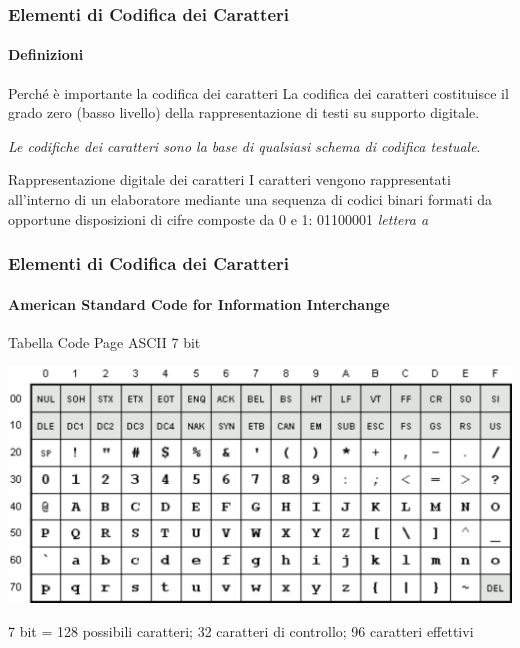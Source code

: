\begin{frame}
	\frametitle{Elementi di Codifica dei Caratteri}
	\framesubtitle{Definizioni}
	\addtocounter{nframe}{1}

	\begin{block}{Perché è importante la codifica dei caratteri}
		La codifica dei caratteri costituisce il grado zero (basso livello) della rappresentazione di testi su supporto digitale.
		\begin{center}
			\textit{Le codifiche dei caratteri sono la base di qualsiasi schema di codifica testuale}.
		\end{center}
	\end{block}

	\begin{block}{Rappresentazione digitale dei caratteri}
		I caratteri vengono rappresentati all’interno di un elaboratore mediante una sequenza di codici binari formati da opportune disposizioni di cifre composte da 0 e 1: 01100001 \textit{lettera a}
	\end{block}

\end{frame}



\begin{frame}
	\frametitle{Elementi di Codifica dei Caratteri}
	\framesubtitle{American Standard Code for Information Interchange}
	\addtocounter{nframe}{1}

	\begin{block}{Tabella Code Page ASCII 7 bit}
		\begin{center}
			\includegraphics[width=.9\textwidth]{imgs/ascii-67.pdf}
		\end{center}

	\end{block}
	\begin{tiny}
		\begin{center}
			7 bit = 128 possibili caratteri; 32 caratteri di controllo; 96 caratteri effettivi
		\end{center}

	\end{tiny}

\end{frame}

